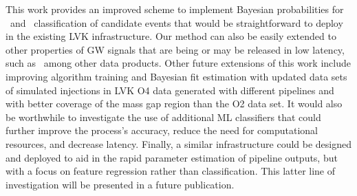 This work provides an improved scheme to implement Bayesian probabilities for \hasns\ and \hasrem\ classification of candidate events that would be straightforward to deploy in the existing LVK
infrastructure. Our method can also be easily extended to other properties of
\ac{GW} signals that are being or may be released in low latency, such as
\hasgap\ among other data products. Other future extensions of this work include improving algorithm training and Bayesian fit estimation with updated data
sets of simulated injections in \ac{LVK} \ac{O4} data generated with different pipelines and with better coverage of the mass gap region than the \ac{O2} data set. It would also be worthwhile to
investigate the use of additional ML classifiers that could further improve the process's accuracy, reduce the need for computational resources, and decrease latency. Finally, a similar
infrastructure could be designed and deployed to aid in the rapid parameter estimation of pipeline outputs, but with a focus on feature regression rather than classification. This latter line of
investigation will be presented in a future publication.





